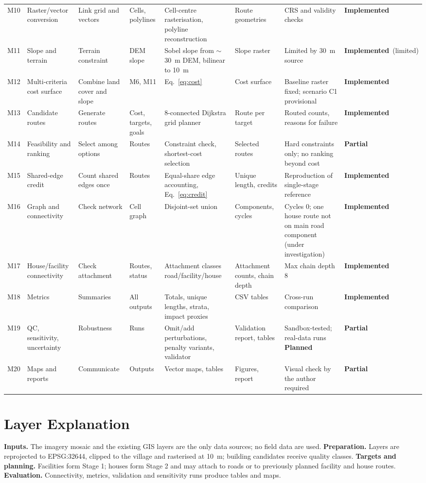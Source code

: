 \documentclass[12pt,a4paper]{report}
\newcommand{\planned}{\textbf{Planned}}
\newcommand{\partialS}{\textbf{Partial}}
\newcommand{\impl}{\textbf{Implemented}}
\begin{document}
\begin{landscape}
\begin{longtable}{@{}L{0.7cm}L{2.4cm}L{3.3cm}L{3.1cm}L{3.4cm}L{3.5cm}L{3.0cm}L{1.8cm}@{}}
M10 & Raster/vector conversion & Link grid and vectors & Cells, polylines & Cell-centre rasterisation, polyline reconstruction & Route geometries & CRS and validity checks & \impl\\
M11 & Slope and terrain & Terrain constraint & DEM slope & Sobel slope from $\sim$30~m DEM, bilinear to 10~m & Slope raster & Limited by 30~m source & \impl\ (limited)\\
M12 & Multi-criteria cost surface & Combine land cover and slope & M6, M11 & Eq.~\eqref{eq:cost} & Cost surface & Baseline raster fixed; scenario C1 provisional & \impl\\
M13 & Candidate routes & Generate routes & Cost, targets, goals & 8-connected Dijkstra grid planner & Route per target & Routed counts, reasons for failure & \impl\\
M14 & Feasibility and ranking & Select among options & Routes & Constraint check, shortest-cost selection & Selected routes & Hard constraints only; no ranking beyond cost & \partialS\\
M15 & Shared-edge credit & Count shared edges once & Routes & Equal-share edge accounting, Eq.~\eqref{eq:credit} & Unique length, credits & Reproduction of single-stage reference & \impl\\
M16 & Graph and connectivity & Check network & Cell graph & Disjoint-set union & Components, cycles & Cycles 0; one house route not on main road component (under investigation) & \impl\\
M17 & House/facility connectivity & Check attachment & Routes, status & Attachment classes road/facility/house & Attachment counts, chain depth & Max chain depth 8 & \impl\\
M18 & Metrics & Summaries & All outputs & Totals, unique lengths, strata, impact proxies & CSV tables & Cross-run comparison & \impl\\
M19 & QC, sensitivity, uncertainty & Robustness & Runs & Omit/add perturbations, penalty variants, validator & Validation report, tables & Sandbox-tested; real-data runs \planned & \partialS\\
M20 & Maps and reports & Communicate & Outputs & Vector maps, tables & Figures, report & Visual check by the author required & \partialS\\
\end{longtable}
\end{landscape}

\section{Layer Explanation}
\textbf{Inputs.} The imagery mosaic and the existing GIS layers are the only data sources; no field data are used. \textbf{Preparation.} Layers are reprojected to EPSG:32644, clipped to the village and rasterised at 10~m; building candidates receive quality classes. \textbf{Targets and planning.} Facilities form Stage 1; houses form Stage 2 and may attach to roads or to previously planned facility and house routes. \textbf{Evaluation.} Connectivity, metrics, validation and sensitivity runs produce tables and maps.
\end{document}
